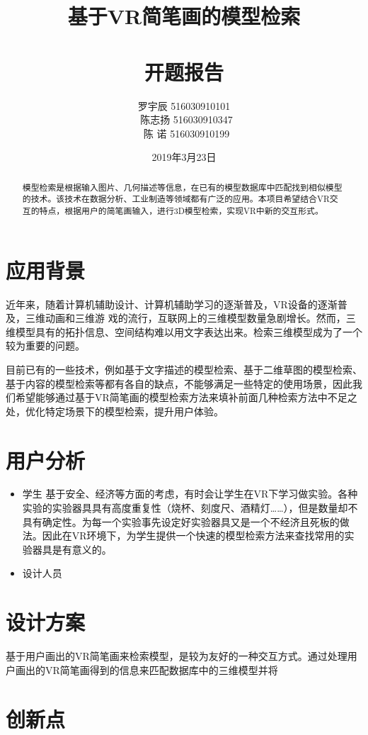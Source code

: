 \documentclass{article}
\title{基于VR简笔画的模型检索\\\ \\ 开题报告}
\author{
罗宇辰 516030910101  \\\
陈志扬 516030910347  \\\
陈  诺 516030910199 
}
\date{2019年3月23日}
\begin{document}
\maketitle
\tableofcontents

\clearpage

\begin{abstract}
模型检索是根据输入图片、几何描述等信息，在已有的模型数据库中匹配找到相似模型的技术。该技术在数据分析、工业制造等领域都有广泛的应用。本项目希望结合VR交互的特点，根据用户的简笔画输入，进行3D模型检索，实现VR中新的交互形式。
\end{abstract}

\section{应用背景}
近年来，随着计算机辅助设计、计算机辅助学习的逐渐普及，VR设备的逐渐普及，三维动画和三维游 戏的流行，互联网上的三维模型数量急剧增长。然而，三维模型具有的拓扑信息、空间结构难以用文字表达出来。检索三维模型成为了一个较为重要的问题。  

目前已有的一些技术，例如基于文字描述的模型检索、基于二维草图的模型检索、基于内容的模型检索等都有各自的缺点，不能够满足一些特定的使用场景，因此我们希望能够通过基于VR简笔画的模型检索方法来填补前面几种检索方法中不足之处，优化特定场景下的模型检索，提升用户体验。

\section{用户分析}
\begin{itemize}
    \item 学生  
    基于安全、经济等方面的考虑，有时会让学生在VR下学习做实验。各种实验的实验器具具有高度重复性（烧杯、刻度尺、酒精灯……），但是数量却不具有确定性。为每一个实验事先设定好实验器具又是一个不经济且死板的做法。因此在VR环境下，为学生提供一个快速的模型检索方法来查找常用的实验器具是有意义的。
    \item 设计人员
    
\end{itemize}


\section{设计方案}
基于用户画出的VR简笔画来检索模型，是较为友好的一种交互方式。通过处理用户画出的VR简笔画得到的信息来匹配数据库中的三维模型并将

\section{创新点}
\end{document}

